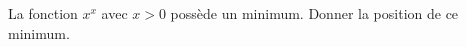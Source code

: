 \begin{exercice}\label{exo0014}

La fonction $x^x$ avec $x>0$ possède un minimum. Donner la position de ce minimum.

\end{exercice}
